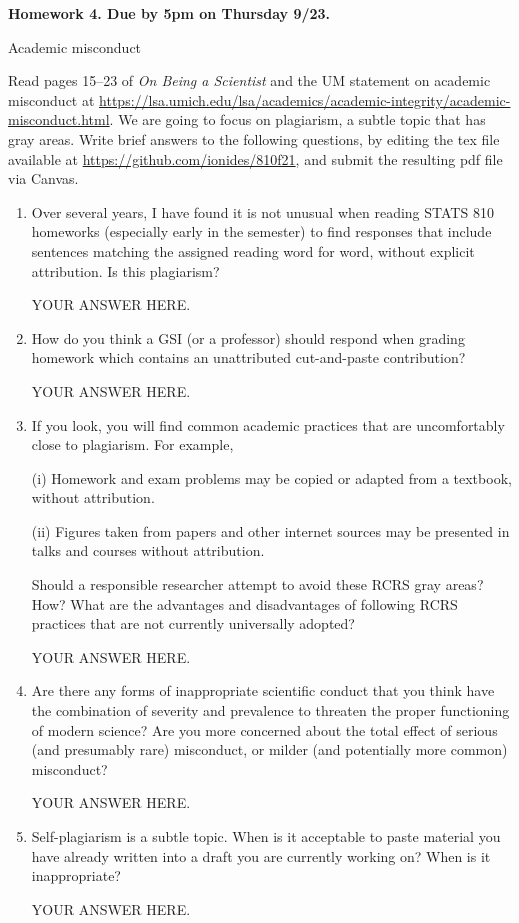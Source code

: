 \documentclass[12pt]{article}
\begin{document}
\begin{center}\bf
Homework 4. Due by 5pm on Thursday 9/23.

Academic misconduct

\end{center}
Read pages 15--23 of {\em On Being a Scientist} and the UM statement on academic misconduct at \url{https://lsa.umich.edu/lsa/academics/academic-integrity/academic-misconduct.html}. We are going to focus on plagiarism, a subtle topic that has gray areas. Write brief answers to the following questions, by editing the tex file available at \url{https://github.com/ionides/810f21}, and submit the resulting pdf file via Canvas. 

\begin{enumerate}

\item Over several years, I have found it is not unusual when reading STATS 810 homeworks (especially early in the semester) to find responses that include sentences matching the assigned reading word for word, without explicit attribution. Is this plagiarism?

YOUR ANSWER HERE.

\item How do you think a GSI (or a professor) should respond when grading homework which contains an unattributed cut-and-paste contribution?

YOUR ANSWER HERE.

\item If you look, you will find common academic practices that are uncomfortably close to plagiarism. For example,

(i) Homework and exam problems may be copied or adapted from a textbook, without attribution.

(ii) Figures taken from papers and other internet sources may be presented in talks and courses without attribution.

Should a responsible researcher attempt to avoid these RCRS gray areas? How? What are the advantages and disadvantages of following RCRS practices that are not currently universally adopted?

YOUR ANSWER HERE.

\item Are there any forms of inappropriate scientific conduct that you think have the combination of severity and prevalence to threaten the proper functioning of modern science? Are you more concerned about the total effect of serious (and presumably rare) misconduct, or milder (and potentially more common) misconduct?

YOUR ANSWER HERE.

\item Self-plagiarism is a subtle topic. When is it acceptable to paste material you have already written into a draft you are currently working on? When is it inappropriate?

YOUR ANSWER HERE.

\end{enumerate}
\end{document}
